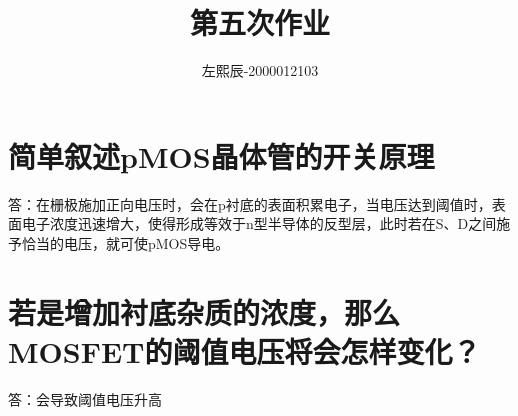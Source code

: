 \documentclass[utf8]{ctexart}
\title{第五次作业}
\author{左熙辰-2000012103}
\begin{document}
	\maketitle
	\section{简单叙述pMOS晶体管的开关原理}
	答：在栅极施加正向电压时，会在p衬底的表面积累电子，当电压达到阈值时，表面电子浓度迅速增大，使得形成等效于n型半导体的反型层，此时若在S、D之间施予恰当的电压，就可使pMOS导电。
	\section{若是增加衬底杂质的浓度，那么MOSFET的阈值电压将会怎样变化？}
	答：会导致阈值电压升高
\end{document}
